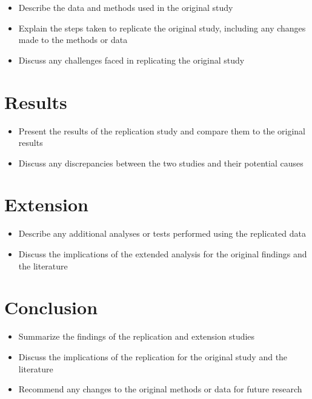 \documentclass[AER]{AEA}
\begin{document}
\begin{itemize}

\item Describe the data and methods used in the original study

\item Explain the steps taken to replicate the original study, including any changes made to the methods or data

\item Discuss any challenges faced in replicating the original study

\end{itemize}

\section{Results}

\begin{itemize}

\item Present the results of the replication study and compare them to the original results

\item Discuss any discrepancies between the two studies and their potential causes

\end{itemize}

\section{Extension}

\begin{itemize}

\item Describe any additional analyses or tests performed using the replicated data

\item Discuss the implications of the extended analysis for the original findings and the literature

\end{itemize}

\section{Conclusion}

\begin{itemize}

\item Summarize the findings of the replication and extension studies

\item Discuss the implications of the replication for the original study and the literature

\item Recommend any changes to the original methods or data for future research

\end{itemize}
\end{document}
